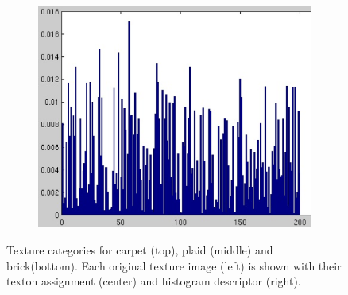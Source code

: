 \documentclass[10pt,twocolumn,letterpaper]{article}
\begin{document}
\begin{figure}
\begin{subfigure}[b]{0.2\textwidth}
        \includegraphics[width=\textwidth]{T14_H01.eps}
    \end{subfigure}
   \caption{Texture categories for carpet (top), plaid (middle) and brick(bottom). Each original texture image (left) is shown with their texton assignment (center) and histogram descriptor (right).}
   \label{fig:imagedesc}
\end{figure}
\end{document}
